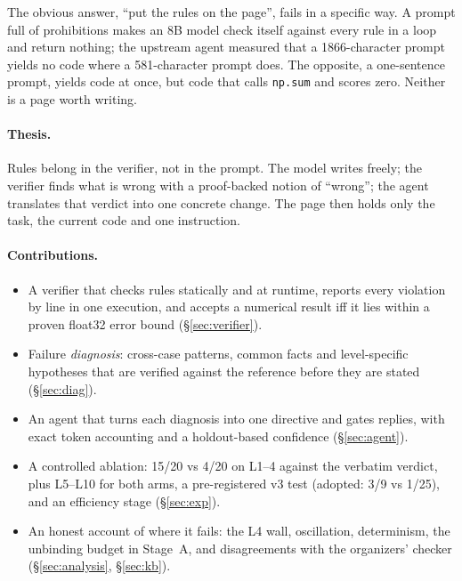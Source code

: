 \documentclass[11pt]{article}
\newcommand{\code}[1]{\texttt{#1}}
\begin{document}
The obvious answer, ``put the rules on the page'', fails in a specific way. A prompt full of
prohibitions makes an 8B model check itself against every rule in a loop and return nothing; the
upstream agent measured that a 1866-character prompt yields no code where a 581-character prompt
does. The opposite, a one-sentence prompt, yields code at once, but code that calls \code{np.sum} and
scores zero. Neither is a page worth writing.

\paragraph{Thesis.} Rules belong in the verifier, not in the prompt. The model writes freely; the
verifier finds what is wrong with a proof-backed notion of ``wrong''; the agent translates that verdict
into one concrete change. The page then holds only the task, the current code and one instruction.

\paragraph{Contributions.}
\begin{itemize}
  \item A verifier that checks rules statically and at runtime, reports every violation by line in one
        execution, and accepts a numerical result iff it lies within a proven float32 error bound
        (\S\ref{sec:verifier}).
  \item Failure \emph{diagnosis}: cross-case patterns, common facts and level-specific hypotheses that
        are verified against the reference before they are stated (\S\ref{sec:diag}).
  \item An agent that turns each diagnosis into one directive and gates replies, with exact token
        accounting and a holdout-based confidence (\S\ref{sec:agent}).
  \item A controlled ablation: 15/20 vs 4/20 on L1--4 against the verbatim verdict, plus L5--L10 for
        both arms, a pre-registered v3 test (adopted: 3/9 vs 1/25), and an efficiency stage (\S\ref{sec:exp}).
  \item An honest account of where it fails: the L4 wall, oscillation, determinism, the unbinding
        budget in Stage~A, and disagreements with the organizers' checker (\S\ref{sec:analysis},
        \S\ref{sec:kb}).
\end{itemize}

\end{document}
